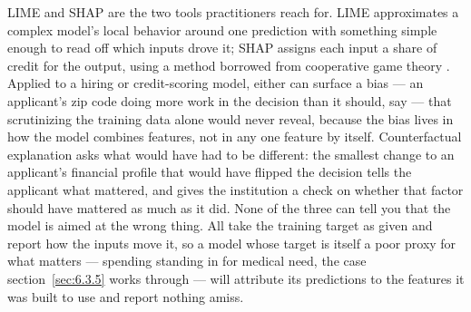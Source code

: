 LIME and SHAP are the two tools practitioners reach for. LIME approximates a complex model's local behavior around one prediction with something simple enough to read off which inputs drove it; SHAP assigns each input a share of credit for the output, using a method borrowed from cooperative game theory \autocite{ribeiro2016why} \autocite{lundberg2017unified}. Applied to a hiring or credit-scoring model, either can surface a bias — an applicant's zip code doing more work in the decision than it should, say — that scrutinizing the training data alone would never reveal, because the bias lives in how the model combines features, not in any one feature by itself. Counterfactual explanation asks what would have had to be different: the smallest change to an applicant's financial profile that would have flipped the decision tells the applicant what mattered, and gives the institution a check on whether that factor should have mattered as much as it did. None of the three can tell you that the model is aimed at the wrong thing. All take the training target as given and report how the inputs move it, so a model whose target is itself a poor proxy for what matters — spending standing in for medical need, the case section~\ref{sec:6.3.5} works through — will attribute its predictions to the features it was built to use and report nothing amiss.
